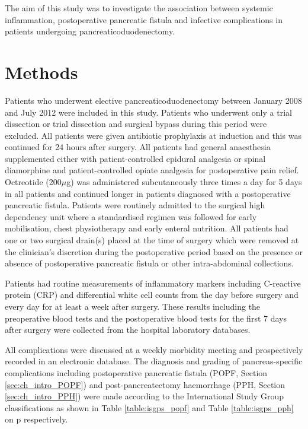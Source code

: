 The aim of this study was to investigate the association between systemic inflammation, postoperative pancreatic fistula and infective complications in patients undergoing pancreaticoduodenectomy.

\section{Methods}
Patients who underwent elective pancreaticoduodenectomy between January 2008 and July 2012 were included in this study. Patients who underwent only a trial dissection or trial dissection and surgical bypass during this period were excluded. All patients were given antibiotic prophylaxis at induction and this was continued for 24 hours after surgery. All patients had general anaesthesia supplemented either with patient-controlled epidural analgesia or spinal diamorphine and patient-controlled opiate analgesia for postoperative pain relief. Octreotide (200$\mu$g) was administered subcutaneously three times a day for 5 days in all patients and continued longer in patients diagnosed with a postoperative pancreatic fistula. Patients were routinely admitted to the surgical high dependency unit where a standardised regimen was followed for early mobilisation, chest physiotherapy and early enteral nutrition. All patients had one or two surgical drain(s) placed at the time of surgery which were removed at the clinician's discretion during the postoperative period based on the presence or absence of postoperative pancreatic fistula or other intra-abdominal collections. 

Patients had routine measurements of inflammatory markers including C-reactive protein (CRP) and differential white cell counts from the day before surgery and every day for at least a week after surgery. These results including the preoperative blood tests and the postoperative blood tests for the first 7 days after surgery were collected from the hospital laboratory databases.

All complications were discussed at a weekly morbidity meeting and prospectively recorded in an electronic database.  The diagnosis and grading of pancreas-specific complications including postoperative pancreatic fistula (POPF, Section \ref{sec:ch_intro_POPF}) and post-pancreatectomy haemorrhage (PPH, Section \ref{sec:ch_intro_PPH}) were made according to the International Study Group classifications as shown in Table \ref{table:isgps_popf} and Table \ref{table:isgps_pph} on p\pageref{table:isgps_popf} respectively.

